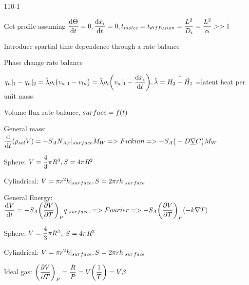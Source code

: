 \begin{mitframe}{110-1}
\begin{listone}
	\item Get profile assuming $\dfrac{\mathrm{d}\dimltemp}{\mathrm{d}\timet}=0, \dfrac{\mathrm{d}\specfrac{i}}{\mathrm{d}\timet}=0, \timet_{molec}=\timet_{diffusion}=\dfrac{\length^2}{\pdiff}=\dfrac{\length^2}{\tdiff}>>1$
    \item Introduce spartial time dependence through a rate balance
    \item Phase change rate balance
    \item $\heatflux_{n}|_1-\heatflux_n|_2=\hat{\wavel}\dens_{\state}\big(\vvel_n|_1-\vvel_{ln}\big)=\hat{\wavel}\dens_{\state}\bigg(\vvel_n|_1-\dfrac{\mathrm{d}\specfrac{i}}{\mathrm{d}\timet}\bigg), \hat{\wavel}=\hat{\enthalpy_2-\hat{\enthalpy_1}}$ =latent heat per unit mass
    \item Volume flux rate balance, $surface=\fug(\timet)$
    \item General mass: $\dfrac{\mathrm{d}}{\mathrm{d}\timet}(\dens_{sol}\vol)=-\entropy_{\helmholtz}\nummoles_{\helmholtz,\pos}|_{surface}\mw=>Fickian=>-\entropy_{\helmholtz}\big(-\elecdisplace\gradop\conc\big)\mw$
    	\begin{listtwo}
        	\item Sphere: $\vol=\dfrac{4}{3}\pi\gasconst^3 , \entropy=4\pi\gasconst^2$
            \item  Cylindrical: $\vol=\pi\pos^2\heattranscoeff|_{surface}, \entropy=2\pi\pos\heattranscoeff|_{surface}$
             \end{listtwo}
	\item General Energy: $\dfrac{\mathrm{d}\vol}{\mathrm{d}\timet}=-\entropy_{\helmholtz}\bigg(\dfrac{\partial\vol}{\partial\Temp}\bigg)_{\p}\heatflux|_{surface}, =>Fourier=>-\entropy_{\helmholtz}\bigg(\dfrac{\partial\vol}{\partial\Temp}\bigg)_{\p}(-\thermcond\nabla\Temp)$
      	\begin{listtwo}
        	\item Sphere: $\vol=\dfrac{4}{3}\pi\gasconst^3$,    $\entropy=4\pi\gasconst^2$
            \item Cylindrical: $\vol=\pi\pos^2\heattranscoeff|_{surface}, \entropy=2\pi\pos\heattranscoeff|_{surface}$
        	\item Ideal gas: $\bigg(\dfrac{\partial\vol}{\partial\Temp}\bigg)_{\p}=\dfrac{\gasconst}{\p}=\vol\bigg(\dfrac{1}{\Temp}\bigg)=\vol\texpcoeff$
            \end{listtwo}

\end{listone}
\end{mitframe}
